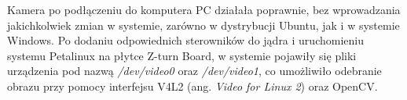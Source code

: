 Kamera po podłączeniu do komputera PC działała poprawnie, bez wprowadzania jakichkolwiek zmian w systemie, zarówno w dystrybucji Ubuntu, jak i w systemie Windows. Po dodaniu odpowiednich sterowników do jądra i uruchomieniu systemu Petalinux na płytce Z-turn Board, w systemie pojawiły się pliki urządzenia pod nazwą \emph{/dev/video0} oraz \emph{/dev/video1}, co umożliwiło odebranie obrazu przy pomocy interfejsu V4L2 (ang. \emph{Video for Linux 2}) oraz OpenCV.
